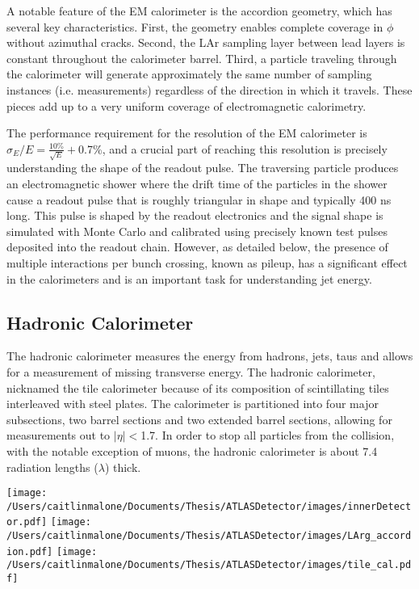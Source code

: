 A notable feature of the EM calorimeter is the accordion geometry, which has several key characteristics.  First, the geometry enables complete coverage in $\phi$ without azimuthal cracks.  Second, the LAr sampling layer between lead layers is constant throughout the calorimeter barrel.  Third, a particle traveling through the calorimeter will generate approximately the same number of sampling instances (i.e. measurements) regardless of the direction in which it travels.  These pieces add up to a very uniform coverage of electromagnetic calorimetry.

The performance requirement for the resolution of the EM calorimeter is $\sigma_E/E=\frac{10\%}{\sqrt{E}}+$0.7\%, and a crucial part of reaching this resolution is precisely understanding the shape of the readout pulse.  The traversing particle produces an electromagnetic shower where the drift time of the particles in the shower cause a readout pulse that is roughly triangular in shape and typically 400 ns long.  This pulse is shaped by the readout electronics and the signal shape is simulated with Monte Carlo and calibrated using precisely known test pulses deposited into the readout chain.  However, as detailed below, the presence of multiple interactions per bunch crossing, known as pileup, has a significant effect in the calorimeters and is an important task for understanding jet energy.

\subsection{Hadronic Calorimeter} 
The hadronic calorimeter measures the energy from hadrons, jets, taus and allows for a measurement of missing transverse energy.  The hadronic calorimeter, nicknamed the tile calorimeter because of its composition of scintillating tiles interleaved with steel plates.  The calorimeter is partitioned into four major subsections, two barrel sections and two extended barrel sections, allowing for measurements out to $|\eta|<$1.7.  In order to stop all particles from the collision, with the notable exception of muons, the hadronic calorimeter is about 7.4 radiation lengths ($\lambda$) thick.

\texttt{[image: /Users/caitlinmalone/Documents/Thesis/ATLASDetector/images/innerDetector.pdf]}\label{fig:inner_detector}
\texttt{[image: /Users/caitlinmalone/Documents/Thesis/ATLASDetector/images/LArg\_accordion.pdf]}\label{fig:lar}
\texttt{[image: /Users/caitlinmalone/Documents/Thesis/ATLASDetector/images/tile\_cal.pdf]}\label{fig:tile_cal}


